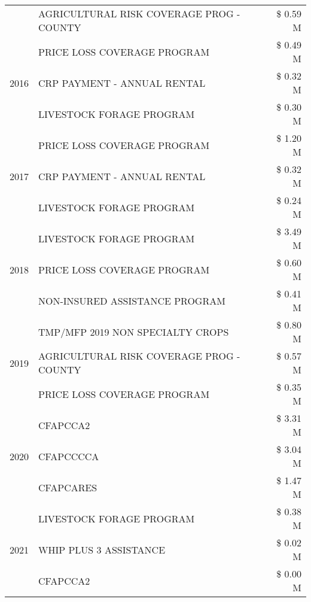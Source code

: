 \begin{tabular}{llr}
 & AGRICULTURAL RISK COVERAGE PROG - COUNTY & \$ 0.59 M \\
\cline{1-3}
\multirow[t]{3}{*}{2016} & PRICE LOSS COVERAGE PROGRAM & \$ 0.49 M \\
 & CRP PAYMENT - ANNUAL RENTAL & \$ 0.32 M \\
 & LIVESTOCK FORAGE PROGRAM & \$ 0.30 M \\
\cline{1-3}
\multirow[t]{3}{*}{2017} & PRICE LOSS COVERAGE PROGRAM & \$ 1.20 M \\
 & CRP PAYMENT - ANNUAL RENTAL & \$ 0.32 M \\
 & LIVESTOCK FORAGE PROGRAM & \$ 0.24 M \\
\cline{1-3}
\multirow[t]{3}{*}{2018} & LIVESTOCK FORAGE PROGRAM & \$ 3.49 M \\
 & PRICE LOSS COVERAGE PROGRAM & \$ 0.60 M \\
 & NON-INSURED ASSISTANCE PROGRAM & \$ 0.41 M \\
\cline{1-3}
\multirow[t]{3}{*}{2019} & TMP/MFP 2019 NON SPECIALTY CROPS & \$ 0.80 M \\
 & AGRICULTURAL RISK COVERAGE PROG - COUNTY & \$ 0.57 M \\
 & PRICE LOSS COVERAGE PROGRAM & \$ 0.35 M \\
\cline{1-3}
\multirow[t]{3}{*}{2020} & CFAPCCA2 & \$ 3.31 M \\
 & CFAPCCCCA & \$ 3.04 M \\
 & CFAPCARES & \$ 1.47 M \\
\cline{1-3}
\multirow[t]{3}{*}{2021} & LIVESTOCK FORAGE PROGRAM & \$ 0.38 M \\
 & WHIP PLUS 3 ASSISTANCE & \$ 0.02 M \\
 & CFAPCCA2 & \$ 0.00 M \\
\cline{1-3}
\bottomrule
\end{tabular}
